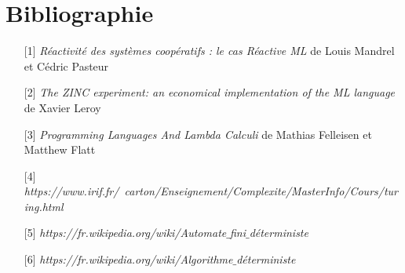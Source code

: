 \documentclass[10pt,a4paper]{article}
\begin{document}
		\section{Bibliographie}
			\begin{itemize}
				\item[] [1] \textit{Réactivité des systèmes coopératifs : le cas Réactive ML} de Louis Mandrel et Cédric Pasteur\label{ReactiveML}
				\item[] [2] \textit{The ZINC experiment: an economical implementation of the ML language} de Xavier Leroy\label{ZINC}
				\item[] [3] \textit{Programming Languages And Lambda Calculi} de Mathias Felleisen et Matthew Flatt\label{Calculi}
				\item[] [4] \textit{https://www.irif.fr/~carton/Enseignement/Complexite/MasterInfo/Cours/turing.html}\label{Turing}
				\item[] [5] \textit{https://fr.wikipedia.org/wiki/Automate$\_$fini$\_$déterministe}\label{AFD}
				\item[] [6] \textit{https://fr.wikipedia.org/wiki/Algorithme$\_$déterministe}\label{MFD}
			\end{itemize}
		
		
\end{document}
